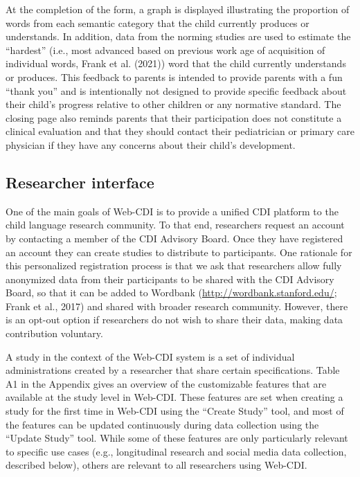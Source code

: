 \documentclass[
  english,
  ,man,floatsintext]{apa6}
\begin{document}
At the completion of the form, a graph is displayed illustrating the proportion of words from each semantic category that the child currently produces or understands. In addition, data from the norming studies are used to estimate the \enquote{hardest} (i.e., most advanced based on previous work age of acquisition of individual words, Frank et al. (2021)) word that the child currently understands or produces. This feedback to parents is intended to provide parents with a fun \enquote{thank you} and is intentionally not designed to provide specific feedback about their child's progress relative to other children or any normative standard. The closing page also reminds parents that their participation does not constitute a clinical evaluation and that they should contact their pediatrician or primary care physician if they have any concerns about their child's development.

\hypertarget{researcher-interface}{%
\subsection{Researcher interface}\label{researcher-interface}}

One of the main goals of Web-CDI is to provide a unified CDI platform to the child language research community. To that end, researchers request an account by contacting a member of the CDI Advisory Board. Once they have registered an account they can create studies to distribute to participants. One rationale for this personalized registration process is that we ask that researchers allow fully anonymized data from their participants to be shared with the CDI Advisory Board, so that it can be added to Wordbank (\url{http://wordbank.stanford.edu/}; Frank et al., 2017) and shared with broader research community. However, there is an opt-out option if researchers do not wish to share their data, making data contribution voluntary.

A study in the context of the Web-CDI system is a set of individual administrations created by a researcher that share certain specifications. Table A1 in the Appendix gives an overview of the customizable features that are available at the study level in Web-CDI. These features are set when creating a study for the first time in Web-CDI using the \enquote{Create Study} tool, and most of the features can be updated continuously during data collection using the \enquote{Update Study} tool. While some of these features are only particularly relevant to specific use cases (e.g., longitudinal research and social media data collection, described below), others are relevant to all researchers using Web-CDI.
\end{document}

